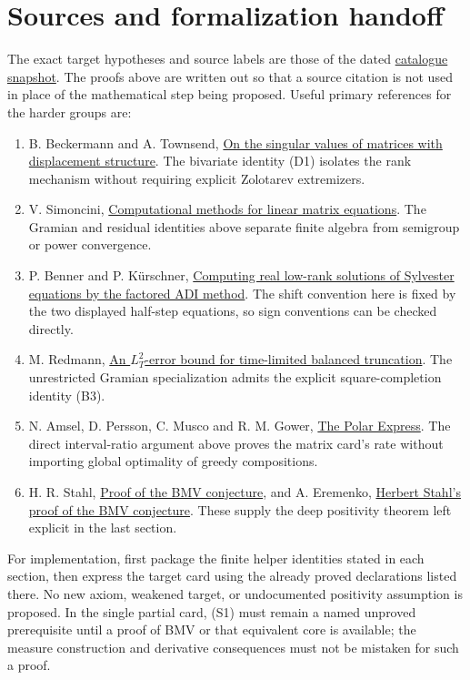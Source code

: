 \documentclass[11pt,a4paper]{article}
\begin{document}
\section*{Sources and formalization handoff}
The exact target hypotheses and source labels are those of the dated
\href{https://github.com/tchen-research/NLAlib/blob/6886918346afb81ba77e71fbbe5daa67c93d2bae/atlas/atlas.json}
{catalogue snapshot}. The proofs above are written out so that a source
citation is not used in place of the mathematical step being proposed.
Useful primary references for the harder groups are:
\begin{enumerate}
\item B. Beckermann and A. Townsend,
\href{https://arxiv.org/abs/1609.09494}{On the singular values of matrices
with displacement structure}. The bivariate identity (D1) isolates the
rank mechanism without requiring explicit Zolotarev extremizers.
\item V. Simoncini,
\href{https://www.dm.unibo.it/~simoncin/matrixeq.pdf}{Computational methods
for linear matrix equations}. The Gramian and residual identities above
separate finite algebra from semigroup or power convergence.
\item P. Benner and P. K\"urschner,
\href{https://csc.mpi-magdeburg.mpg.de/preprints/2013/MPIMD13-05.pdf}
{Computing real low-rank solutions of Sylvester equations by the factored
ADI method}. The shift convention here is fixed by the two displayed
half-step equations, so sign conventions can be checked directly.
\item M. Redmann,
\href{https://arxiv.org/abs/1907.05478}{An $L^2_T$-error bound for time-limited
balanced truncation}. The unrestricted Gramian specialization admits the
explicit square-completion identity (B3).
\item N. Amsel, D. Persson, C. Musco and R. M. Gower,
\href{https://arxiv.org/abs/2505.16932v5}{The Polar Express}.
The direct interval-ratio argument above proves the matrix card's rate
without importing global optimality of greedy compositions.
\item H. R. Stahl,
\href{https://arxiv.org/abs/1107.4875v3}{Proof of the BMV conjecture},
and A. Eremenko,
\href{https://arxiv.org/abs/1312.6003}{Herbert Stahl's proof of the BMV conjecture}.
These supply the deep positivity theorem left explicit in the last section.
\end{enumerate}

For implementation, first package the finite helper identities stated in
each section, then express the target card using the already proved
declarations listed there. No new axiom, weakened target, or undocumented
positivity assumption is proposed. In the single partial card, (S1) must
remain a named unproved prerequisite until a proof of BMV or that equivalent
core is available; the measure construction and derivative consequences
must not be mistaken for such a proof.
\end{document}
